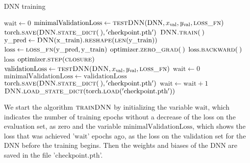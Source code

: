 \begin{algorithm}[H]%
\caption{\label{trainDNN}DNN training}
\begin{algorithmic}[1]
\State $\mathrm{wait} \gets 0$
\State $\mathrm{minimalValidationLoss} \gets \Call{testDNN}{\mathrm{DNN}, x_\mathrm{val}, y_\mathrm{val}, \textproc{loss\_fn}}$
\State $\mathrm{torch.}\Call{save}{\textproc{DNN.}\protect\Call{state\_dict}{\:}, \mathrm{'checkpoint.pth'}}$
\State\label{startTrainStep} $\textproc{DNN.}\Call{train}{\:}$
    \State $\mathrm{y\_pred} \gets \Call{DNN}{\mathrm{x\_train}}\Call{.reshape}{\protect\Call{len}{\mathrm{y\_train}}}$
    \State $\mathrm{loss} \gets \Call{loss\_fn}{\mathrm{y\_pred}, \mathrm{y\_train}}$
    \State $\mathrm{optimizer.}\Call{zero\_grad}{\:}$
    \State $\mathrm{loss.}\Call{backward}{\:}$
    \State \Return $\mathrm{loss}$
\EndFunction
\State\label{endTrainStep} $\mathrm{optimizer.}\Call{step}{\textproc{closure}}$
\State $\mathrm{validationLoss} \gets \Call{testDNN}{\textproc{DNN}, x_\mathrm{val}, y_\mathrm{val}, \textproc{loss\_fn}}$
\State $\mathrm{wait} \gets 0$
\State $\mathrm{minimalValidationLoss} \gets \mathrm{validationLoss}$
\State $\mathrm{torch.}\Call{save}{\textproc{DNN.}\protect\Call{state\_dict}{\:}, \mathrm{'checkpoint.pth'}}$
\Else
\State $\mathrm{wait} \gets \mathrm{wait}+1$
\EndIf
{}
\State $\textproc{DNN.}\Call{load\_state\_dict}{\mathrm{torch.}\protect\Call{load}{\mathrm{'checkpoint.pth'}}}$
\State \Return
\EndIf
\EndFor
\EndFunction
\end{algorithmic}
\end{algorithm}

We start the algorithm $\textproc{trainDNN}$ by initializing the variable $\mathrm{wait}$, which indicates the number of training epochs without a decrease of the loss on the evaluation set, as zero and the variable $\mathrm{minimalValidationLoss}$, which shows the loss that was achieved '$\mathrm{wait}$' epochs ago, as the loss on the validation set for the DNN before the training begins. Then the weights and biases of the DNN are saved in the file '$\mathrm{checkpoint.pth}$'.

